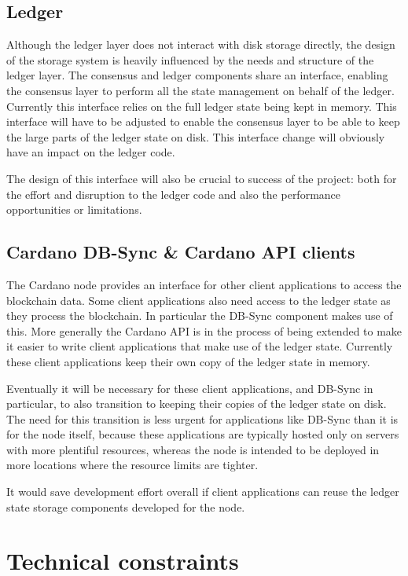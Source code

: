 \documentclass[11pt,a4paper]{article}
\begin{document}
\subsection{Ledger}

Although the ledger layer does not interact with disk storage directly, the
design of the storage system is heavily influenced by the needs and structure
of the ledger layer. The consensus and ledger components share an interface,
enabling the consensus layer to perform all the state management on behalf of
the ledger. Currently this interface relies on the full ledger state being kept
in memory. This interface will have to be adjusted to enable the consensus
layer to be able to keep the large parts of the ledger state on disk. This
interface change will obviously have an impact on the ledger code.

The design of this interface will also be crucial to success of the project:
both for the effort and disruption to the ledger code and also the performance
opportunities or limitations.

\subsection{Cardano DB-Sync \& Cardano API clients}

The Cardano node provides an interface for other client applications to access
the blockchain data. Some client applications also need access to the ledger
state as they process the blockchain. In particular the DB-Sync component
makes use of this. More generally the Cardano API is in the process of being
extended to make it easier to write client applications that make use of the
ledger state. Currently these client applications keep their own copy of the
ledger state in memory.

Eventually it will be necessary for these client applications, and DB-Sync in
particular, to also transition to keeping their copies of the ledger state on
disk. The need for this transition is less urgent for applications like DB-Sync
than it is for the node itself, because these applications are typically hosted
only on servers with more plentiful resources, whereas the node is intended to
be deployed in more locations where the resource limits are tighter.

It would save development effort overall if client applications can reuse the
ledger state storage components developed for the node.

\section{Technical constraints}
\label{constraints}
\end{document}
